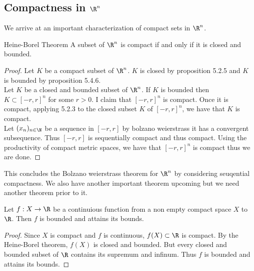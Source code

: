 \documentclass[a4paper]{article}
\begin{document}
\subsection{Compactness in $\R^n$}
We arrive at an important characterization of compact sets in $\R^n$. 
\begin{thm}{Heine-Borel Theorem}{} A subset of $\R^n$ is compact if and only if it is closed and bounded. 
\begin{proof}
Let $K$ be a compact subset of $\R^n$. $K$ is closed by proposition 5.2.5 and $K$ is bounded by proposition 5.4.6. \\
Let $K$ be a closed and bounded subset of $\R^n$. If $K$ is bounded then $K\subset[-r,r]^n$ for some $r>0$. I claim that $[-r,r]^n$ is compact. Once it is compact, applying 5.2.3 to the closed subset $K$ of $[-r,r]^n$, we have that $K$ is compact. \\
Let $(x_n)_{n\in\N}$ be a sequence in $[-r,r]$ by bolzano weierstrass it has a convergent subsequence. Thus $[-r,r]$ is sequentially compact and thus compact. Using the productivity of compact metric spaces, we have that $[-r,r]^n$ is compact thus we are done. 
\end{proof}
\end{thm}

This concludes the Bolzano weierstrass theorem for $\R^n$ by considering seuqential compactness. We also have another important theorem upcoming but we need another theorem prior to it. 

\begin{thm}{}{} Let $f:X\to\R$ be a continuious function from a non empty compact space $X$ to $\R$. Then $f$ is bounded and attains its bounds. 
\begin{proof}
Since $X$ is compact and $f$ is continuous, $f(X)\subset\R$ is compact. By the Heine-Borel theorem, $f(X)$ is closed and bounded. But every closed and bounded subset of $\R$ contains its supremum and infinum. Thus $f$ is bounded and attains its bounds. 
\end{proof}
\end{thm}
\end{document}

